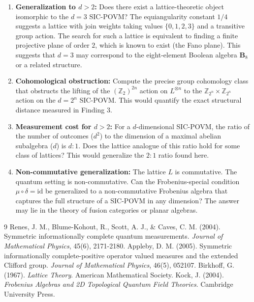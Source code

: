 \documentclass{article}
\begin{document}
\begin{enumerate}
    \item \textbf{Generalization to $d>2$:} Does there exist a lattice-theoretic object isomorphic to the $d=3$ SIC-POVM? The equiangularity constant $1/4$ suggests a lattice with join weights taking values $\{0, 1, 2, 3\}$ and a transitive group action. The search for such a lattice is equivalent to finding a finite projective plane of order $2$, which is known to exist (the Fano plane). This suggests that $d=3$ may correspond to the eight-element Boolean algebra $\mathbf{B}_8$ or a related structure.

    \item \textbf{Cohomological obstruction:} Compute the precise group cohomology class that obstructs the lifting of the $(\mathbb{Z}_2)^{2n}$ action on $L^{\otimes n}$ to the $\mathbb{Z}_{2^n} \times \mathbb{Z}_{2^n}$ action on the $d=2^n$ SIC-POVM. This would quantify the exact structural distance measured in Finding 3.

    \item \textbf{Measurement cost for $d>2$:} For a $d$-dimensional SIC-POVM, the ratio of the number of outcomes ($d^2$) to the dimension of a maximal abelian subalgebra ($d$) is $d:1$. Does the lattice analogue of this ratio hold for some class of lattices? This would generalize the $2:1$ ratio found here.

    \item \textbf{Non-commutative generalization:} The lattice $L$ is commutative. The quantum setting is non-commutative. Can the Frobenius-special condition $\mu \circ \delta = \mathrm{id}$ be generalized to a non-commutative Frobenius algebra that captures the full structure of a SIC-POVM in any dimension? The answer may lie in the theory of fusion categories or planar algebras.
\end{enumerate}


\begin{thebibliography}{9}
 Renes, J. M., Blume-Kohout, R., Scott, A. J., \& Caves, C. M. (2004). Symmetric informationally complete quantum measurements. \textit{Journal of Mathematical Physics}, 45(6), 2171-2180.
 Appleby, D. M. (2005). Symmetric informationally complete-positive operator valued measures and the extended Clifford group. \textit{Journal of Mathematical Physics}, 46(5), 052107.
 Birkhoff, G. (1967). \textit{Lattice Theory}. American Mathematical Society.
 Kock, J. (2004). \textit{Frobenius Algebras and 2D Topological Quantum Field Theories}. Cambridge University Press.
\end{thebibliography}
\end{document}
